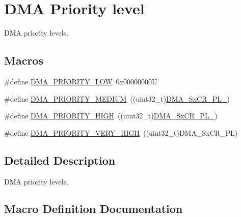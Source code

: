 \hypertarget{group___d_m_a___priority__level}{}\section{D\+MA Priority level}
\label{group___d_m_a___priority__level}


D\+MA priority levels.  


\subsection*{Macros}
\begin{DoxyCompactItemize}
\item 
\#define \hyperlink{group___d_m_a___priority__level_ga0d1ed2bc9229ba3c953002bcf3a72130}{D\+M\+A\+\_\+\+P\+R\+I\+O\+R\+I\+T\+Y\+\_\+\+L\+OW}~0x00000000U
\item 
\#define \hyperlink{group___d_m_a___priority__level_gad6fbeee76fd4a02cbed64365bb4c1781}{D\+M\+A\+\_\+\+P\+R\+I\+O\+R\+I\+T\+Y\+\_\+\+M\+E\+D\+I\+UM}~((uint32\+\_\+t)\hyperlink{group___peripheral___registers___bits___definition_ga41b1b2f7bd6f0af932ff0fb7df9336b6}{D\+M\+A\+\_\+\+Sx\+C\+R\+\_\+\+P\+L\+\_})
\item 
\#define \hyperlink{group___d_m_a___priority__level_ga6b2f5c5e22895f8b4bd52a27ec6cae2a}{D\+M\+A\+\_\+\+P\+R\+I\+O\+R\+I\+T\+Y\+\_\+\+H\+I\+GH}~((uint32\+\_\+t)\hyperlink{group___peripheral___registers___bits___definition_ga81817adc8c0ee54dea0f67a1a9e8eb77}{D\+M\+A\+\_\+\+Sx\+C\+R\+\_\+\+P\+L\+\_})
\item 
\#define \hyperlink{group___d_m_a___priority__level_gaed0542331a4d875d1d8d5b2878e9372c}{D\+M\+A\+\_\+\+P\+R\+I\+O\+R\+I\+T\+Y\+\_\+\+V\+E\+R\+Y\+\_\+\+H\+I\+GH}~((uint32\+\_\+t)D\+M\+A\+\_\+\+Sx\+C\+R\+\_\+\+PL)
\end{DoxyCompactItemize}


\subsection{Detailed Description}
D\+MA priority levels. 



\subsection{Macro Definition Documentation}
\mbox{\label{group___d_m_a___priority__level_ga6b2f5c5e22895f8b4bd52a27ec6cae2a}} 
